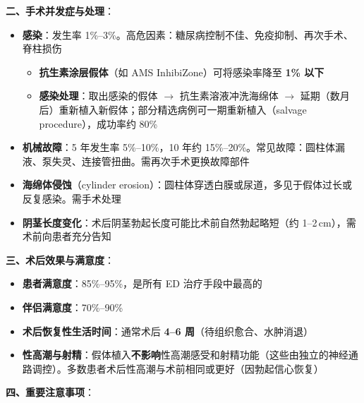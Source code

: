 \documentclass[12pt,a4paper,twoside]{ctexbook}
\begin{document}
\vspace{0.5em}
\noindent\textbf{二、手术并发症与处理}：

\begin{itemize}[leftmargin=2cm]
	\item \textbf{感染}：发生率 1\%--3\%。高危因素：糖尿病控制不佳、免疫抑制、再次手术、脊柱损伤
	\begin{itemize}
		\item \textbf{抗生素涂层假体}（如 AMS InhibiZone）可将感染率降至 \textbf{1\% 以下}
		\item \textbf{感染处理}：取出感染的假体 $\rightarrow$ 抗生素溶液冲洗海绵体 $\rightarrow$ 延期（数月后）重新植入新假体；部分精选病例可一期重新植入（salvage procedure），成功率约 80\%
	\end{itemize}
	\item \textbf{机械故障}：5 年发生率 5\%--10\%，10 年约 15\%--20\%。常见故障：圆柱体漏液、泵失灵、连接管扭曲。需再次手术更换故障部件
	\item \textbf{海绵体侵蚀}（cylinder erosion）：圆柱体穿透白膜或尿道，多见于假体过长或反复感染。需手术处理
	\item \textbf{阴茎长度变化}：术后阴茎勃起长度可能比术前自然勃起略短（约 1--2\,cm），需术前向患者充分告知
\end{itemize}

\vspace{0.5em}
\noindent\textbf{三、术后效果与满意度}：

\begin{itemize}[leftmargin=2cm]
	\item \textbf{患者满意度}：85\%--95\%，是所有 ED 治疗手段中最高的
	\item \textbf{伴侣满意度}：70\%--90\%
	\item \textbf{术后恢复性生活时间}：通常术后 \textbf{4--6 周}（待组织愈合、水肿消退）
	\item \textbf{性高潮与射精}：假体植入\textbf{不影响}性高潮感受和射精功能（这些由独立的神经通路调控）。多数患者术后性高潮与术前相同或更好（因勃起信心恢复）
\end{itemize}

\vspace{0.5em}
\noindent\textbf{四、重要注意事项}：
\end{document}
